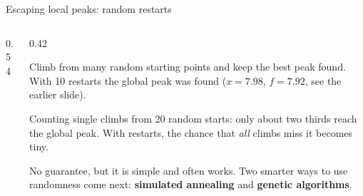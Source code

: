 \documentclass[aspectratio=169,10pt]{beamer}
\begin{document}
\begin{frame}{Escaping local peaks: random restarts}
\begin{columns}[T]
\begin{column}{0.54\textwidth}
\vspace{2mm}
\end{column}
\begin{column}{0.42\textwidth}
{\small
Climb from many random starting points and keep the best peak found. With 10 restarts the global peak was found ($x=7.98$, $f=7.92$, see the earlier slide).

\vspace{2mm}
Counting single climbs from 20 random starts: only about two thirds reach the global peak. With restarts, the chance that \emph{all} climbs miss it becomes tiny.

\vspace{2mm}
No guarantee, but it is simple and often works. Two smarter ways to use randomness come next: \textbf{simulated annealing} and \textbf{genetic algorithms}.}
\end{column}
\end{columns}
\end{frame}
\end{document}
